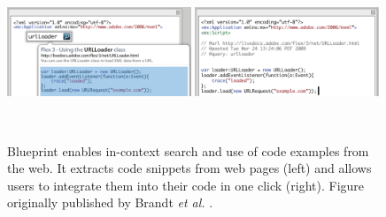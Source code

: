 
\begin{figure}[b!]
\centering
  \includegraphics[width=0.49\textwidth]{figures/blueprint1.png}
  \hfill
  \includegraphics[width=0.49\textwidth]{figures/blueprint2.png}
  \caption{Blueprint enables in-context search and use of code examples from the web. It extracts code snippets from web pages (left) and allows users to integrate them into their code in one click (right).  Figure originally published by Brandt \textit{et al.} \cite{Brandt2010}.}~\label{fig:intro_blueprint}
\end{figure}

